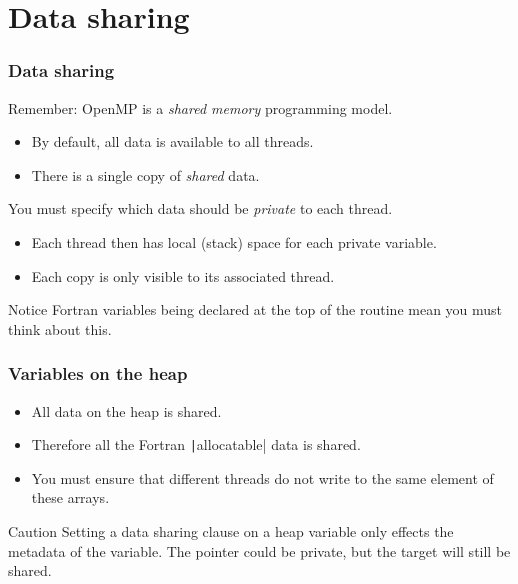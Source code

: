 \documentclass{beamer}
\begin{document}

\section{Data sharing}
\begin{frame}
\frametitle{Data sharing}
Remember: OpenMP is a \emph{shared memory} programming model.
\begin{itemize}
  \item By default, all data is available to all threads.
  \item There is a single copy of \emph{shared} data.
\end{itemize}

\vfill

You must specify which data should be \emph{private} to each thread.
\begin{itemize}
  \item Each thread then has local (stack) space for each private variable.
  \item Each copy is only visible to its associated thread.
\end{itemize}

\begin{block}{Notice}
Fortran variables being declared at the top of the routine mean you must think about this.
\end{block}

\end{frame}


\begin{frame}
\frametitle{Variables on the heap}
\begin{itemize}
  \item All data on the heap is shared.
  \item Therefore all the Fortran \texttt|allocatable| data is shared.
  \item You must ensure that different threads do not write to the same element of these arrays.
\end{itemize}

\begin{alertblock}{Caution}
Setting a data sharing clause on a heap variable only effects the metadata of the variable.
The pointer could be private, but the target will still be shared.
\end{alertblock}
\end{frame}
\end{document}
